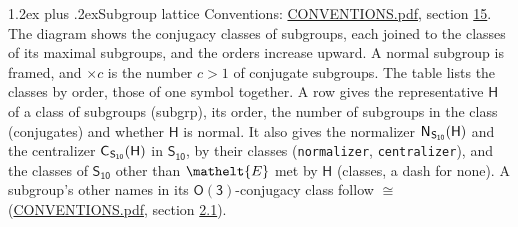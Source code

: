 \documentclass[10pt,a4paper]{article}
\makeatletter
\renewcommand\section{\@startsection{section}{1}{\z@}{-3ex plus -1ex minus -.2ex}%
  {1.2ex plus .2ex}{\normalfont\large\sffamily\bfseries\color{parttitle}}}
\numberwithin{equation}{section}
\newcommand{\eltfont}[1]{{\let\sigma\eltsigma\mathelt{#1}}}
\newcommand{\grp}[1]{\mathsf{#1}}
\newcommand{\cls}[1]{\eltfont{#1}}
\newcommand{\samecls}{\cong}
\newcommand{\hairsp}{\mkern1mu}
\makeatother
\begin{document}
\section{Subgroup lattice}\label{s:subgroups}
Conventions: \href{../../CONVENTIONS.pdf}{CONVENTIONS.pdf}, section \href{../../CONVENTIONS.pdf\#conv.15}{15}.
The diagram shows the conjugacy classes of subgroups, each joined to the classes of its maximal subgroups, and the orders increase upward. \label{n:index.conjugates.c}A normal subgroup is framed, and ${\times}c$ is the number $c > 1$ of conjugate subgroups. The table lists the classes by order, those of one symbol together. \label{n:group.H}\label{n:head.subgroup}\label{n:head.order}\label{n:head.conjugates}\label{n:head.normal}A row gives the representative $\grp{H}$ of a class of subgroups (subgrp), its order, the number of subgroups in the class (conjugates) and whether $\grp{H}$ is normal. \label{n:group.normalizer}\label{n:group.centralizer}\label{n:head.classes}It also gives the normalizer $\grp{N}_{\hairsp \grp{S_{10}}}(\grp{H})$ and the centralizer $\grp{C}_{\hairsp \grp{S_{10}}}(\grp{H})$ in $\grp{S_{10}}$, by their classes (\texttt{normalizer}, \texttt{centralizer}), and the classes of $\grp{S_{10}}$ other than $\cls{E}$ met by $\grp{H}$ (classes, a dash for none). A subgroup's other names in its \href{O3.pdf}{$\grp{O(3)}$}-conjugacy class follow $\samecls$ (\href{../../CONVENTIONS.pdf}{CONVENTIONS.pdf}, section \href{../../CONVENTIONS.pdf\#conv.2.1}{2.1}).
\begin{center}
\end{center}
\end{document}
